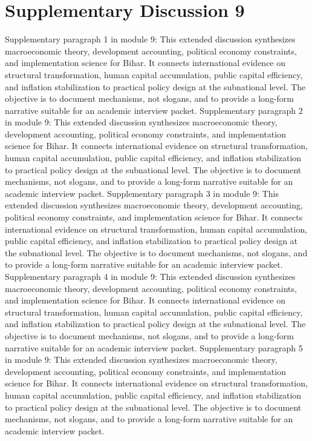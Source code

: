 \documentclass[preprint,12pt]{elsarticle}
\begin{document}
\section{Supplementary Discussion 9}
Supplementary paragraph 1 in module 9: This extended discussion synthesizes macroeconomic theory, development accounting, political economy constraints, and implementation science for Bihar. It connects international evidence on structural transformation, human capital accumulation, public capital efficiency, and inflation stabilization to practical policy design at the subnational level. The objective is to document mechanisms, not slogans, and to provide a long-form narrative suitable for an academic interview packet.
Supplementary paragraph 2 in module 9: This extended discussion synthesizes macroeconomic theory, development accounting, political economy constraints, and implementation science for Bihar. It connects international evidence on structural transformation, human capital accumulation, public capital efficiency, and inflation stabilization to practical policy design at the subnational level. The objective is to document mechanisms, not slogans, and to provide a long-form narrative suitable for an academic interview packet.
Supplementary paragraph 3 in module 9: This extended discussion synthesizes macroeconomic theory, development accounting, political economy constraints, and implementation science for Bihar. It connects international evidence on structural transformation, human capital accumulation, public capital efficiency, and inflation stabilization to practical policy design at the subnational level. The objective is to document mechanisms, not slogans, and to provide a long-form narrative suitable for an academic interview packet.
Supplementary paragraph 4 in module 9: This extended discussion synthesizes macroeconomic theory, development accounting, political economy constraints, and implementation science for Bihar. It connects international evidence on structural transformation, human capital accumulation, public capital efficiency, and inflation stabilization to practical policy design at the subnational level. The objective is to document mechanisms, not slogans, and to provide a long-form narrative suitable for an academic interview packet.
Supplementary paragraph 5 in module 9: This extended discussion synthesizes macroeconomic theory, development accounting, political economy constraints, and implementation science for Bihar. It connects international evidence on structural transformation, human capital accumulation, public capital efficiency, and inflation stabilization to practical policy design at the subnational level. The objective is to document mechanisms, not slogans, and to provide a long-form narrative suitable for an academic interview packet.
\end{document}
